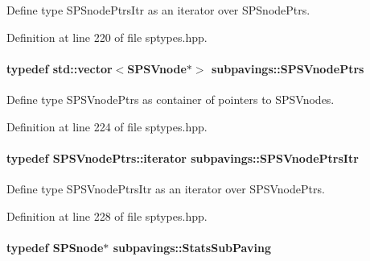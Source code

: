 \-Define type \-S\-P\-Snode\-Ptrs\-Itr as an iterator over \-S\-P\-Snode\-Ptrs. 



\-Definition at line 220 of file sptypes.\-hpp.

\hypertarget{namespacesubpavings_a90b5f0e33fa46403066cc5a89929e6a9}{
\paragraph[{\-S\-P\-S\-Vnode\-Ptrs}]{\setlength{\rightskip}{0pt plus 5cm}typedef std\-::vector$<${\bf \-S\-P\-S\-Vnode}$\ast$$>$ {\bf subpavings\-::\-S\-P\-S\-Vnode\-Ptrs}}}\label{namespacesubpavings_a90b5f0e33fa46403066cc5a89929e6a9}


\-Define type \-S\-P\-S\-Vnode\-Ptrs as container of pointers to \-S\-P\-S\-Vnodes. 



\-Definition at line 224 of file sptypes.\-hpp.

\hypertarget{namespacesubpavings_ab5ab2047c25b17d5bb636a25ff65b0b0}{
\paragraph[{\-S\-P\-S\-Vnode\-Ptrs\-Itr}]{\setlength{\rightskip}{0pt plus 5cm}typedef \-S\-P\-S\-Vnode\-Ptrs\-::iterator {\bf subpavings\-::\-S\-P\-S\-Vnode\-Ptrs\-Itr}}}\label{namespacesubpavings_ab5ab2047c25b17d5bb636a25ff65b0b0}


\-Define type \-S\-P\-S\-Vnode\-Ptrs\-Itr as an iterator over \-S\-P\-S\-Vnode\-Ptrs. 



\-Definition at line 228 of file sptypes.\-hpp.

\hypertarget{namespacesubpavings_ace6b16f0adf0db13eeb38e124d5328c6}{
\paragraph[{\-Stats\-Sub\-Paving}]{\setlength{\rightskip}{0pt plus 5cm}typedef {\bf \-S\-P\-Snode}$\ast$ {\bf subpavings\-::\-Stats\-Sub\-Paving}}}\label{namespacesubpavings_ace6b16f0adf0db13eeb38e124d5328c6}


